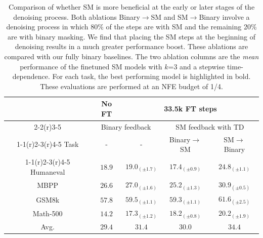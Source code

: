 \begin{table}[h!]
\centering
\begin{tabular}{ccccc}
\toprule
     & No FT & \multicolumn{3}{c}{33.5k FT steps}      \\\cmidrule(r){2-2}\cmidrule(r){3-5}
    & \multicolumn{2}{c}{Binary feedback} & \multicolumn{2}{c}{SM feedback with TD} \\\cmidrule(r){1-1}\cmidrule(r){2-3}\cmidrule(r){4-5}
Task & -                & -                & Binary$\rightarrow$SM  & SM$\rightarrow$Binary \\\cmidrule(r){1-1}\cmidrule(r){2-3}\cmidrule(r){4-5}
Humaneval & $18.9$& $19.0_{(\pm 1.7)}$& $17.4_{(\pm 0.9)}$& $\mathbf{24.8}_{(\pm 1.1)}$\\
MBPP      & $26.6$& $27.0_{(\pm 1.6)}$& $25.2_{(\pm 1.3)}$& $\mathbf{30.9}_{(\pm 0.5)}$\\
GSM8k     & $57.8$& $59.5_{(\pm 1.1)}$& $59.3_{(\pm 1.1)}$& $\mathbf{61.6}_{(\pm 2.5)}$\\
Math-500  & $14.2$& $17.3_{(\pm 1.2)}$& $18.2_{(\pm 0.8)}$& $\mathbf{20.2}_{(\pm 1.9)}$\\
 \midrule
Avg.      & $29.4$& $31.4$&	$30.0$& $\mathbf{34.4}$\\ \bottomrule
\end{tabular}
\caption{Comparison of whether SM is more beneficial at the early or later stages of the denoising process. Both ablations Binary$\rightarrow$SM and SM$\rightarrow$Binary involve a denoising process in which 80\% of the steps are with SM and the remaining 20\% are with binary masking. We find that placing the SM steps at the beginning of denoising results in a much greater performance boost. These ablations are compared with our fully binary baselines. The two ablation columns are the \textit{mean} performance of the finetuned SM models with $k$=3 and a stepwise time-dependence. For each task, the best performing model is highlighted in bold. These evaluations are performed at an NFE budget of 1/4.}
\label{tab:time_dependence}
\end{table}